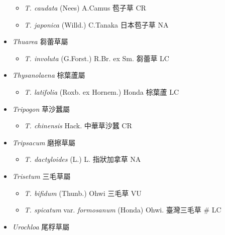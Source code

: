 \begin{itemize}
  \begin{itemize}
        \item[] \textit{T. caudata} (Nees) A.Camus  苞子草   CR
        \item[] \textit{T. japonica} (Willd.) C.Tanaka  日本苞子草   NA
  \end{itemize}
 \item[] \textit{Thuarea} 芻蕾草屬
                                
  \begin{itemize}
        \item[] \textit{T. involuta} (G.Forst.) R.Br. ex Sm.  芻蕾草   LC
  \end{itemize}
 \item[] \textit{Thysanolaena} 棕葉蘆屬
                                
  \begin{itemize}
        \item[] \textit{T. latifolia} (Roxb. ex Hornem.) Honda  棕葉蘆   LC
  \end{itemize}
 \item[] \textit{Tripogon} 草沙蠶屬
                                
  \begin{itemize}
        \item[] \textit{T. chinensis} Hack.  中華草沙蠶   CR
  \end{itemize}
 \item[] \textit{Tripsacum} 磨擦草屬
                                
  \begin{itemize}
        \item[] \textit{T. dactyloides} (L.) L.  指狀加拿草   NA
  \end{itemize}
 \item[] \textit{Trisetum} 三毛草屬
                                
  \begin{itemize}
        \item[] \textit{T. bifidum} (Thunb.) Ohwi  三毛草   VU
        \item[] \textit{T. spicatum} var. \textit{formosanum} (Honda) Ohwi.  臺灣三毛草  \# LC
  \end{itemize}
 \item[] \textit{Urochloa} 尾稃草屬
                                

\end{itemize}
